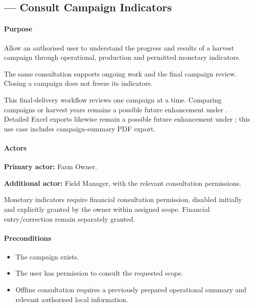 \subsection{ --- Consult Campaign Indicators}
\label{uc:19}

\paragraph{Purpose}

Allow an authorised user to understand
the progress and results of a harvest campaign
through operational, production and permitted
monetary indicators.

The same consultation supports ongoing work
and the final campaign review.
Closing a campaign does not freeze its indicators.

This final-delivery workflow reviews one campaign at a time. Comparing campaigns
or harvest years remains a possible future enhancement under
.
Detailed Excel exports likewise remain a possible future enhancement under
; this use case includes campaign-summary PDF export.


\paragraph{Actors}

\textbf{Primary actor:} Farm Owner.

\textbf{Additional actor:} Field Manager,
with the relevant
consultation permissions.

Monetary indicators require financial consultation permission, disabled initially and explicitly granted by the owner within assigned scope. Financial entry/correction remain separately granted.

\paragraph{Preconditions}

\begin{itemize}
    \item The campaign exists.
    \item The user has permission
    to consult the requested scope.
    \item Offline consultation requires
    a previously prepared operational summary
    and relevant authorised local information.
\end{itemize}

